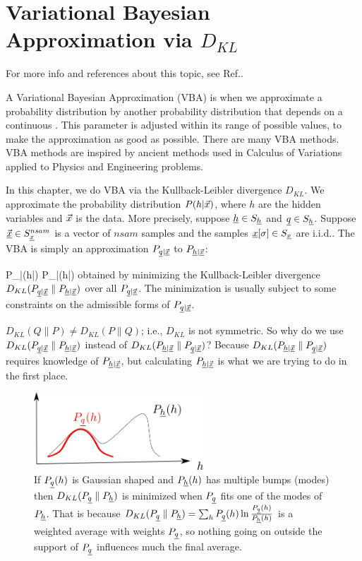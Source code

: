 \chapter{Variational Bayesian Approximation
via $D_{KL}$}

For more info and references about
this topic, see Ref.\cite{wiki-var-bay}.

A Variational Bayesian Approximation (VBA)
is when we approximate
a probability distribution
by another 
probability distribution that depends
on a continuous .
This parameter is
adjusted 
within its range of possible values,
to make the approximation
as good as possible.
There are many VBA methods.
VBA methods are inspired by 
ancient  methods
used in Calculus 
of Variations applied to Physics
and Engineering problems.

In this chapter, we do VBA via 
the Kullback-Leibler divergence $D_{KL}$.
We approximate the probability 
distribution $P(h|{\vec{x}})$,
where $h$ are the hidden variables 
and ${\vec{x}}$ is the data. 
More precisely, suppose $\rvh\in S_\rvh$ and $\rvq\in S_\rvh$.
Suppose $\vec{\rvx}\in S_\rvx^{nsam}$
 is a vector of $nsam$ samples
and the samples $\rvx[\sigma]\in S_\rvx$ are i.i.d..
 The VBA is simply 
an approximation
$P_{\rvq|\vec{\rvx}}$ to
$P_{\rvh|\vec{\rvx}}$:


\beq
P_{\rvh|\vec{\rvx}}(h|\vecx)
\approx P_{\rvq|\vec{\rvx}}(h|\vecx)
\eeq
obtained by minimizing the Kullback-Leibler divergence
$D_{KL}(P_{\rvq|\vec{\rvx}}\parallel
P_{\rvh|\vec{\rvx}})$
over all 
$P_{\rvq|\vec{\rvx}}$. The minimization
is 
usually subject to some constraints
on the admissible forms of 
$P_{\rvq|\vec{\rvx}}$.


$D_{KL}(Q\parallel P)\neq
D_{KL}(P\parallel Q)$; i.e.,  $D_{KL}$ is not
symmetric. So why do we use 
$D_{KL}(P_{\rvq|\vec{\rvx}}\parallel
P_{\rvh|\vec{\rvx}})$
instead of 
$D_{KL}(
P_{\rvh|\vec{\rvx}}\parallel P_{\rvq|\vec{\rvx}})$?
Because 
$D_{KL}(
P_{\rvh|\vec{\rvx}}\parallel P_{\rvq|\vec{\rvx}})$
requires knowledge of $P_{\rvh|\vec{\rvx}}$,
but calculating $P_{\rvh|\vec{\rvx}}$
is what we are trying to do in the first place.

\begin{figure}[h!]
\centering
\includegraphics[width=2.5in]
{var-bay/kl-q-support.png}
\caption{
If $P_\rvq(h)$
is Gaussian shaped 
and $P_\rvh(h)$
has multiple
bumps (modes)
then 
$D_{KL}(P_\rvq\parallel P_\rvh)$
is minimized when $P_\rvq$
fits one of the modes of $P_\rvh$.
That is because $D_{KL}(P_\rvq\parallel P_\rvh)=
\sum_h P_\rvq(h)\ln \frac{P_\rvq(h)}{P_\rvh(h)}$
is a weighted average with weights $P_\rvq$,
so nothing going on outside the support
of $P_\rvq$ influences  much
the final average.
}
\label{fig-kl-q-support}
\end{figure}


